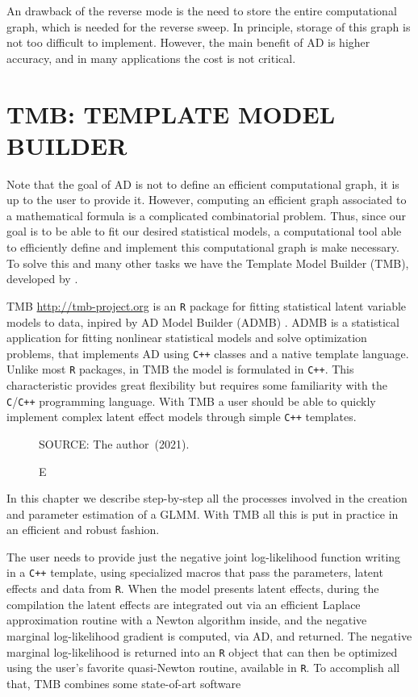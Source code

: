 An drawback of the reverse mode is the need to store the entire
computational graph, which is needed for the reverse sweep. In
principle, storage of this graph is not too difficult to implement.
However, the main benefit of AD is higher accuracy, and in many
applications the cost is not critical.

\section{TMB: TEMPLATE MODEL BUILDER}
\label{cap:tmb}

Note that the goal of AD is not to define an efficient computational
graph, it is up to the user to provide it. However, computing an
efficient graph associated to a mathematical formula is a complicated
combinatorial problem. Thus, since our goal is to be able to fit our
desired statistical models, a computational tool able to efficiently
define and implement this computational graph is make necessary. To
solve this and many other tasks we have the Template Model Builder
(TMB), developed by .

TMB \url{ http://tmb-project.org} is an \texttt{R} \cite{R21} package
for fitting statistical latent variable models to data, inpired by AD
Model Builder (ADMB) \cite{ADMB}. ADMB is a statistical application for
fitting nonlinear statistical models and solve optimization problems,
that implements AD using \texttt{C++} classes and a native template
language. Unlike most \texttt{R} packages, in TMB the model is
formulated in \texttt{C++}. This characteristic provides great
flexibility but requires some familiarity with the
\texttt{C}/\texttt{C++} programming language. With TMB a user should be
able to quickly implement complex latent effect models through simple
\texttt{C++} templates.

\begin{figure}[H]
 \setlength{\abovecaptionskip}{.0001pt}
 \caption{E}
 \vspace{0.3cm}\centering
 
 \begin{footnotesize}
  SOURCE: The author~(2021).
 \end{footnotesize}
 \label{fig:tmbex}
\end{figure}

In this chapter we describe step-by-step all the processes involved in
the creation and parameter estimation of a GLMM. With TMB all this is
put in practice in an efficient and robust fashion.

The user needs to provide just the negative joint log-likelihood
function writing in a \texttt{C++} template, using specialized macros
that pass the parameters, latent effects and data from \texttt{R}. When
the model presents latent effects, during the compilation the latent
effects are integrated out via an efficient Laplace approximation
routine with a Newton algorithm inside, and the negative marginal
log-likelihood gradient is computed, via AD, and returned. The negative
marginal log-likelihood is returned into an \texttt{R} object that can
then be optimized using the user's favorite quasi-Newton routine,
available in \texttt{R}. To accomplish all that, TMB combines some
state-of-art software

